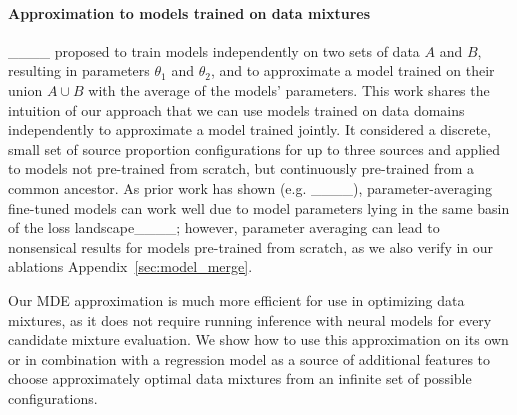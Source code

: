 


\paragraph{Approximation to models trained on data mixtures}

____ proposed to train models independently on two sets of data $A$ and $B$, resulting in parameters $\theta_1$ and $\theta_2$, and to approximate a model trained on their union $A \cup B$ with the average of the models' parameters. This work shares the intuition of our approach that we can use models trained on data domains independently to approximate a model trained jointly.  It  considered a discrete, small set of source proportion configurations for up to three sources and applied to models not pre-trained from scratch, but continuously pre-trained from a common ancestor. As prior work has shown (e.g. ____), parameter-averaging fine-tuned models can work well due to model parameters lying in the same basin of the loss landscape____; however, parameter averaging can lead to nonsensical results for models pre-trained from scratch, as we also verify in our ablations Appendix~\ref{sec:model_merge}.

Our  MDE approximation is much more efficient for use in optimizing data mixtures, as it does not require running inference with neural models for every candidate mixture evaluation. We show how to use this approximation on its own or in combination with a regression model as a source of additional features to choose approximately optimal data mixtures from an infinite set of possible configurations.